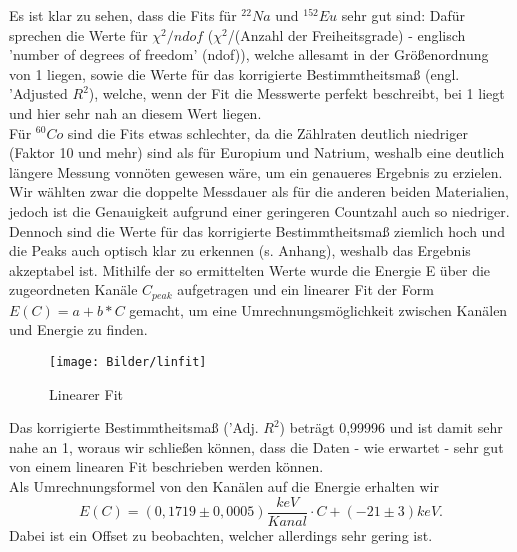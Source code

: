   Es ist klar zu sehen, dass die Fits für $^{22}Na$ und $^{152}Eu$ sehr gut sind: Dafür sprechen die Werte für $\chi^{2}/ndof$ ($\chi^{2}$/(Anzahl der Freiheitsgrade) - englisch 'number of degrees of freedom' (ndof)), welche allesamt in der Größenordnung von 1 liegen, sowie die Werte für das korrigierte Bestimmtheitsmaß (engl. 'Adjusted $R^{2}$), welche, wenn der Fit die Messwerte perfekt beschreibt, bei 1 liegt und hier sehr nah an diesem Wert liegen.\\
  Für $^{60}Co$ sind die Fits etwas schlechter, da die Zählraten deutlich niedriger (Faktor 10 und mehr) sind als für Europium und Natrium, weshalb eine deutlich längere Messung vonnöten gewesen wäre, um ein genaueres Ergebnis zu erzielen. Wir wählten zwar die doppelte Messdauer als für die anderen beiden Materialien, jedoch ist die Genauigkeit aufgrund einer geringeren Countzahl auch so niedriger. Dennoch sind die Werte für das korrigierte Bestimmtheitsmaß ziemlich hoch und die Peaks auch optisch klar zu erkennen (s. Anhang), weshalb das Ergebnis akzeptabel ist.
\clearpage
  Mithilfe der so ermittelten Werte wurde die Energie E über die zugeordneten Kanäle $C_{peak}$ aufgetragen und ein linearer Fit der Form $E(C)=a+b*C$ gemacht, um eine Umrechnungsmöglichkeit zwischen Kanälen und Energie zu finden.
  \begin{figure}[h]
  \begin{center}
  \texttt{[image: Bilder/linfit]}
  \caption{Linearer Fit}
  \end{center}
  \end{figure}
  Das korrigierte Bestimmtheitsmaß ('Adj. $R^{2}$) beträgt 0,99996 und ist damit sehr nahe an 1, woraus wir schließen können, dass die Daten - wie erwartet - sehr gut von einem linearen Fit beschrieben werden können. \\
  Als Umrechnungsformel von den Kanälen auf die Energie erhalten wir 
  \[E(C)=(0,1719\pm0,0005)\frac{keV}{Kanal}\cdot C+(-21\pm3)keV.\]
  Dabei ist ein Offset zu beobachten, welcher allerdings sehr gering ist.

